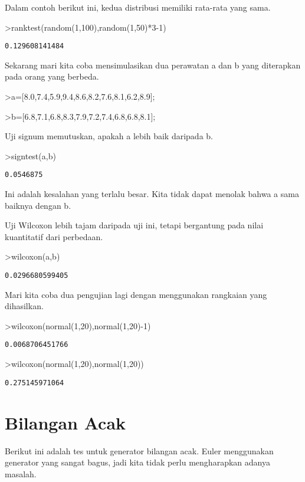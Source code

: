 \documentclass[
]{book}
\begin{document}
Dalam contoh berikut ini, kedua distribusi memiliki rata-rata yang sama.

\textgreater ranktest(random(1,100),random(1,50)*3-1)

\begin{verbatim}
0.129608141484
\end{verbatim}

Sekarang mari kita coba mensimulasikan dua perawatan a dan b yang diterapkan pada orang yang berbeda.

\textgreater a={[}8.0,7.4,5.9,9.4,8.6,8.2,7.6,8.1,6.2,8.9{]};

\textgreater b={[}6.8,7.1,6.8,8.3,7.9,7.2,7.4,6.8,6.8,8.1{]};

Uji signum memutuskan, apakah a lebih baik daripada b.

\textgreater signtest(a,b)

\begin{verbatim}
0.0546875
\end{verbatim}

Ini adalah kesalahan yang terlalu besar. Kita tidak dapat menolak bahwa a sama baiknya dengan b.

Uji Wilcoxon lebih tajam daripada uji ini, tetapi bergantung pada nilai kuantitatif dari perbedaan.

\textgreater wilcoxon(a,b)

\begin{verbatim}
0.0296680599405
\end{verbatim}

Mari kita coba dua pengujian lagi dengan menggunakan rangkaian yang dihasilkan.

\textgreater wilcoxon(normal(1,20),normal(1,20)-1)

\begin{verbatim}
0.0068706451766
\end{verbatim}

\textgreater wilcoxon(normal(1,20),normal(1,20))

\begin{verbatim}
0.275145971064
\end{verbatim}

\chapter{Bilangan Acak}\label{bilangan-acak}

Berikut ini adalah tes untuk generator bilangan acak. Euler menggunakan generator yang sangat bagus, jadi kita tidak perlu mengharapkan adanya masalah.
\end{document}
